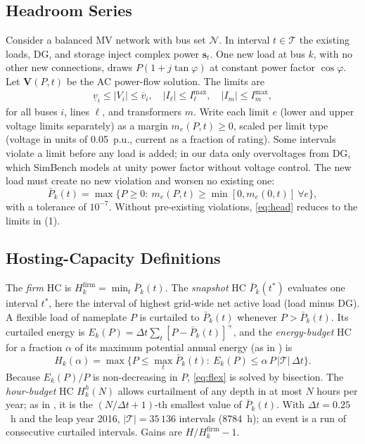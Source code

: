 \documentclass[conference,letterpaper]{IEEEtran}
\begin{document}
\subsection{Headroom Series}
Consider a balanced MV network with bus set $\mathcal N$. In interval $t\in\mathcal T$ the existing loads, DG, and storage inject complex power $\mathbf s_t$. One new load at bus $k$, with no other new connections, draws $P(1+j\tan\varphi)$ at constant power factor $\cos\varphi$. Let $\mathbf V(P,t)$ be the AC power-flow solution. The limits are
\begin{align}
\underline v_i \le |V_i| \le \overline v_i,\quad |I_\ell|\le I_\ell^{\max},\quad |I_m|\le I_m^{\max},
\end{align}
for all buses $i$, lines $\ell$, and transformers $m$. Write each limit $e$ (lower and upper voltage limits separately) as a margin $m_e(P,t)\ge 0$, scaled per limit type (voltage in units of 0.05~p.u., current as a fraction of rating). Some intervals violate a limit before any load is added; in our data only overvoltages from DG, which SimBench models at unity power factor without voltage control. The new load must create no new violation and worsen no existing one:
\begin{equation}
\bar P_k(t)=\max\{P\ge 0:\ m_e(P,t)\ge\min[0,m_e(0,t)]\ \forall e\},\label{eq:head}
\end{equation}
with a tolerance of $10^{-7}$. Without pre-existing violations, \eqref{eq:head} reduces to the limits in (1).

\subsection{Hosting-Capacity Definitions}
The \emph{firm} HC is $H_k^{\mathrm{firm}}=\min_{t}\bar P_k(t)$. The \emph{snapshot} HC $\bar P_k(t^\ast)$ evaluates one interval $t^\ast$, here the interval of highest grid-wide net active load (load minus DG). A flexible load of nameplate $P$ is curtailed to $\bar P_k(t)$ whenever $P>\bar P_k(t)$. Its curtailed energy is $E_k(P)=\Delta t\sum_t[P-\bar P_k(t)]^+$, and the \emph{energy-budget} HC for a fraction $\alpha$ of its maximum potential annual energy (as in \cite{duke}) is
\begin{equation}
H_k(\alpha)=\max\{P\le \max_t\bar P_k(t):\ E_k(P)\le \alpha\,P\,|\mathcal T|\,\Delta t\}.\label{eq:flex}
\end{equation}
Because $E_k(P)/P$ is non-decreasing in $P$, \eqref{eq:flex} is solved by bisection. The \emph{hour-budget} HC $H_k^{h}(N)$ allows curtailment of any depth in at most $N$ hours per year; as in \cite{gu2026hicss}, it is the $(N/\Delta t+1)$-th smallest value of $\bar P_k(t)$. With $\Delta t=0.25$~h and the leap year 2016, $|\mathcal T|=35\,136$ intervals (8784~h); an event is a run of consecutive curtailed intervals. Gains are $H/H_k^{\mathrm{firm}}-1$.
\end{document}
